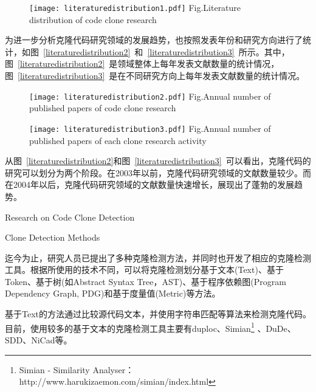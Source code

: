 \begin{figure}[h]
\centering
\texttt{[image: literaturedistribution1.pdf]}
{Fig.$\!$}{Literature distribution of code clone research}
\vspace{-1em}
\end{figure}

为进一步分析克隆代码研究领域的发展趋势，也按照发表年份和研究方向进行了统计，如图~\ref{literaturedistribution2}~和~\ref{literaturedistribution3}~所示。其中，图~\ref{literaturedistribution2}~是领域整体上每年发表文献数量的统计情况，图~\ref{literaturedistribution3}~是在不同研究方向上每年发表文献数量的统计情况。

\begin{figure}[h]
\centering
\texttt{[image: literaturedistribution2.pdf]}
{Fig.$\!$}{Annual number of published papers of code clone research}
\vspace{-1em}
\end{figure}

\begin{figure}[h]
\centering
\texttt{[image: literaturedistribution3.pdf]}
{Fig.$\!$}{Annual number of published papers of each clone research activity}
\end{figure}

从图~\ref{literaturedistribution2}和图~\ref{literaturedistribution3}~可以看出，克隆代码的研究可以划分为两个阶段。在2003年以前，克隆代码研究领域的文献数量较少。而在2004年以后，克隆代码研究领域的文献数量快速增长，展现出了蓬勃的发展趋势。

{Research on Code Clone Detection }
\label{ref-detection}

{Clone Detection Methods}

迄今为止，研究人员已提出了多种克隆检测方法，并同时也开发了相应的克隆检测工具。根据所使用的技术不同，可以将克隆检测划分基于文本(Text)、基于Token、基于树(如Abstract Syntax Tree，AST)、基于程序依赖图(Program Dependency Graph, PDG)和基于度量值(Metric)等方法。

基于Text的方法通过比较源代码文本，并使用字符串匹配等算法来检测克隆代码。目前，使用较多的基于文本的克隆检测工具主要有duploc\cite{ducasse1999language}、Simian\footnote{Simian - Similarity Analyser：http://www.harukizaemon.com/simian/index.html}%
、DuDe\cite{wettel2005archeology}、SDD\cite{lee2005sdd}、NiCad\cite{roy2008nicad}等。

